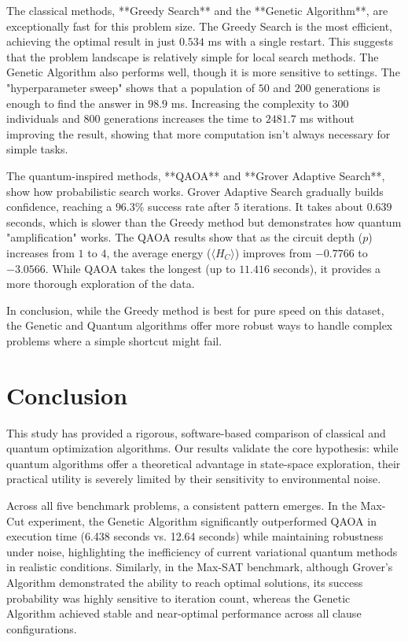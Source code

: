 \documentclass[12pt]{article}
\begin{document}
The classical methods, **Greedy Search** and the **Genetic Algorithm**, are exceptionally fast for this problem size. The Greedy Search is the most efficient, achieving the optimal result in just $0.534$ ms with a single restart. This suggests that the problem landscape is relatively simple for local search methods. The Genetic Algorithm also performs well, though it is more sensitive to settings. The "hyperparameter sweep" shows that a population of $50$ and $200$ generations is enough to find the answer in $98.9$ ms. Increasing the complexity to $300$ individuals and $800$ generations increases the time to $2481.7$ ms without improving the result, showing that more computation isn't always necessary for simple tasks.

The quantum-inspired methods, **QAOA** and **Grover Adaptive Search**, show how probabilistic search works. Grover Adaptive Search gradually builds confidence, reaching a $96.3\%$ success rate after $5$ iterations. It takes about $0.639$ seconds, which is slower than the Greedy method but demonstrates how quantum "amplification" works. The QAOA results show that as the circuit depth ($p$) increases from $1$ to $4$, the average energy ($\langle H_C \rangle$) improves from $-0.7766$ to $-3.0566$. While QAOA takes the longest (up to $11.416$ seconds), it provides a more thorough exploration of the data. 

In conclusion, while the Greedy method is best for pure speed on this dataset, the Genetic and Quantum algorithms offer more robust ways to handle complex problems where a simple shortcut might fail.

\section{Conclusion}
This study has provided a rigorous, software-based comparison of classical and quantum optimization algorithms. Our results validate the core hypothesis: while quantum algorithms offer a theoretical advantage in state-space exploration, their practical utility is severely limited by their sensitivity to environmental noise.

Across all five benchmark problems, a consistent pattern emerges. In the Max-Cut experiment, the Genetic Algorithm significantly outperformed QAOA in execution time (6.438 seconds vs. 12.64 seconds) while maintaining robustness under noise, highlighting the inefficiency of current variational quantum methods in realistic conditions. Similarly, in the Max-SAT benchmark, although Grover’s Algorithm demonstrated the ability to reach optimal solutions, its success probability was highly sensitive to iteration count, whereas the Genetic Algorithm achieved stable and near-optimal performance across all clause configurations.
\end{document}
